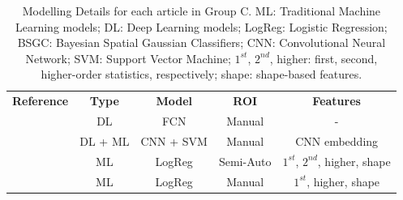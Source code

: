 \documentclass[11pt]{article}
\begin{document}
\begin{table}[]
    \centering
    \begin{tabular}{ccccc}\toprule
        \multirow{2}{*}{\textbf{Reference}} & \multirow{2}{*}{\textbf{Type}} & \multirow{2}{*}{\textbf{Model}} & \multirow{2}{*}{\textbf{ROI}} & \multirow{2}{*}{\textbf{Features}} \\
        \\ \midrule
        \cite{Bi2017}                       & DL                             & FCN                             & Manual                        & -                                  \\
        \cite{Bi2022}                       & DL + ML                        & CNN + SVM                       & Manual                        & CNN embedding                      \\
        \cite{Kong2022}                     & ML                             & LogReg                          & Semi-Auto                     & $1^{st}$, $2^{nd}$, higher, shape  \\
        \cite{Zheng2020}                    & ML                             & LogReg                          & Manual                        & $1^{st}$, higher, shape            \\
        \bottomrule
    \end{tabular}
    \caption{Modelling Details for each article in Group C. ML: Traditional Machine Learning models; DL: Deep Learning models; LogReg: Logistic Regression;
        BSGC: Bayesian Spatial Gaussian Classifiers; CNN: Convolutional Neural Network; SVM: Support Vector Machine;
        $1^{st}$, $2^{nd}$, higher: first, second, higher-order statistics, respectively; shape: shape-based features.}
    \label{tab:model_C}
\end{table}
\end{document}
